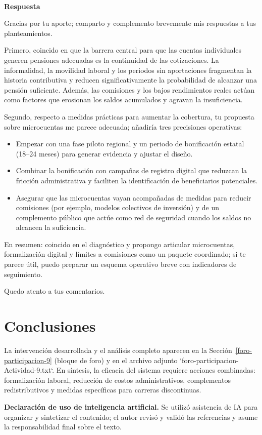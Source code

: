 \documentclass[11pt,letterpaper,oneside]{article}
\newcommand{\foroCopyButton}[1]{%
  \textattachfile[appearance={},description={Participacion del foro (texto copiable)},mimetype=text/plain]{#1}{%
    \colorbox{unadmGreen}{\small\textcolor{white}{\,Copiar participación\,}}%
  }%
}
\begin{document}
\begin{forobox}[title={Respuesta a una participación}]
\hfill\foroCopyButton{foro-respuesta-Actividad-9.txt}\\[-0.5em]
\textbf{Respuesta}

Gracias por tu aporte; comparto y complemento brevemente mis respuestas a tus planteamientos.

Primero, coincido en que la barrera central para que las cuentas individuales generen pensiones adecuadas es la continuidad de las cotizaciones. La informalidad, la movilidad laboral y los periodos sin aportaciones fragmentan la historia contributiva y reducen significativamente la probabilidad de alcanzar una pensión suficiente. Además, las comisiones y los bajos rendimientos reales actúan como factores que erosionan los saldos acumulados y agravan la insuficiencia.

Segundo, respecto a medidas prácticas para aumentar la cobertura, tu propuesta sobre microcuentas me parece adecuada; añadiría tres precisiones operativas:
\begin{itemize}
  \item Empezar con una fase piloto regional y un periodo de bonificación estatal (18–24 meses) para generar evidencia y ajustar el diseño.
  \item Combinar la bonificación con campañas de registro digital que reduzcan la fricción administrativa y faciliten la identificación de beneficiarios potenciales.
  \item Asegurar que las microcuentas vayan acompañadas de medidas para reducir comisiones (por ejemplo, modelos colectivos de inversión) y de un complemento público que actúe como red de seguridad cuando los saldos no alcancen la suficiencia.
\end{itemize}

En resumen: coincido en el diagnóstico y propongo articular microcuentas, formalización digital y límites a comisiones como un paquete coordinado; si te parece útil, puedo preparar un esquema operativo breve con indicadores de seguimiento.

Quedo atento a tus comentarios.
\end{forobox}

\section{Conclusiones}

La intervención desarrollada y el análisis completo aparecen en la Sección~\ref{foro-participacion-9} (bloque de foro) y en el archivo adjunto `foro-participacion-Actividad-9.txt`. En síntesis, la eficacia del sistema requiere acciones combinadas: formalización laboral, reducción de costos administrativos, complementos redistributivos y medidas específicas para carreras discontinuas.

\textbf{Declaración de uso de inteligencia artificial.} Se utilizó asistencia de IA para organizar y sintetizar el contenido; el autor revisó y validó las referencias y asume la responsabilidad final sobre el texto.

\nocite{bricenoRuiz2011,lissste2026,lss2026,consarSitio2026,materialS9DSS2026}

\end{document}
